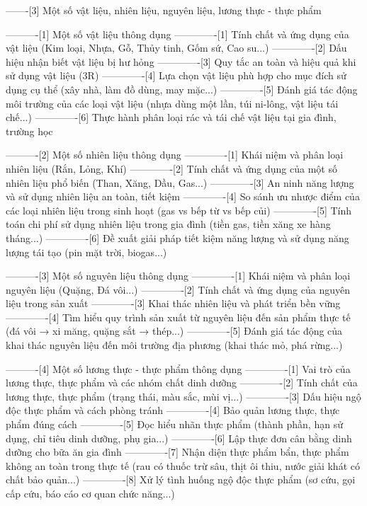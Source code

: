 -------[3] Một số vật liệu, nhiên liệu, nguyên liệu, lương thực - thực phẩm

----------[1] Một số vật liệu thông dụng
-------------[1] Tính chất và ứng dụng của vật liệu (Kim loại, Nhựa, Gỗ, Thủy tinh, Gốm sứ, Cao su...)
-------------[2] Dấu hiệu nhận biết vật liệu bị hư hỏng
-------------[3] Quy tắc an toàn và hiệu quả khi sử dụng vật liệu (3R)
-------------[4] Lựa chọn vật liệu phù hợp cho mục đích sử dụng cụ thể (xây nhà, làm đồ dùng, may mặc...)
-------------[5] Đánh giá tác động môi trường của các loại vật liệu (nhựa dùng một lần, túi ni-lông, vật liệu tái chế...)
-------------[6] Thực hành phân loại rác và tái chế vật liệu tại gia đình, trường học

----------[2] Một số nhiên liệu thông dụng
-------------[1] Khái niệm và phân loại nhiên liệu (Rắn, Lỏng, Khí)
-------------[2] Tính chất và ứng dụng của một số nhiên liệu phổ biến (Than, Xăng, Dầu, Gas...)
-------------[3] An ninh năng lượng và sử dụng nhiên liệu an toàn, tiết kiệm
-------------[4] So sánh ưu nhược điểm của các loại nhiên liệu trong sinh hoạt (gas vs bếp từ vs bếp củi)
-------------[5] Tính toán chi phí sử dụng nhiên liệu trong gia đình (tiền gas, tiền xăng xe hàng tháng...)
-------------[6] Đề xuất giải pháp tiết kiệm năng lượng và sử dụng năng lượng tái tạo (pin mặt trời, biogas...)

----------[3] Một số nguyên liệu thông dụng
-------------[1] Khái niệm và phân loại nguyên liệu (Quặng, Đá vôi...)
-------------[2] Tính chất và ứng dụng của nguyên liệu trong sản xuất
-------------[3] Khai thác nhiên liệu và phát triển bền vững
-------------[4] Tìm hiểu quy trình sản xuất từ nguyên liệu đến sản phẩm thực tế (đá vôi → xi măng, quặng sắt → thép...)
-------------[5] Đánh giá tác động của khai thác nguyên liệu đến môi trường địa phương (khai thác mỏ, phá rừng...)

----------[4] Một số lương thực - thực phẩm thông dụng
-------------[1] Vai trò của lương thực, thực phẩm và các nhóm chất dinh dưỡng
-------------[2] Tính chất của lương thực, thực phẩm (trạng thái, màu sắc, mùi vị...)
-------------[3] Dấu hiệu ngộ độc thực phẩm và cách phòng tránh
-------------[4] Bảo quản lương thực, thực phẩm đúng cách
-------------[5] Đọc hiểu nhãn thực phẩm (thành phần, hạn sử dụng, chỉ tiêu dinh dưỡng, phụ gia...)
-------------[6] Lập thực đơn cân bằng dinh dưỡng cho bữa ăn gia đình
-------------[7] Nhận diện thực phẩm bẩn, thực phẩm không an toàn trong thực tế (rau có thuốc trừ sâu, thịt ôi thiu, nước giải khát có chất bảo quản...)
-------------[8] Xử lý tình huống ngộ độc thực phẩm (sơ cứu, gọi cấp cứu, báo cáo cơ quan chức năng...)


